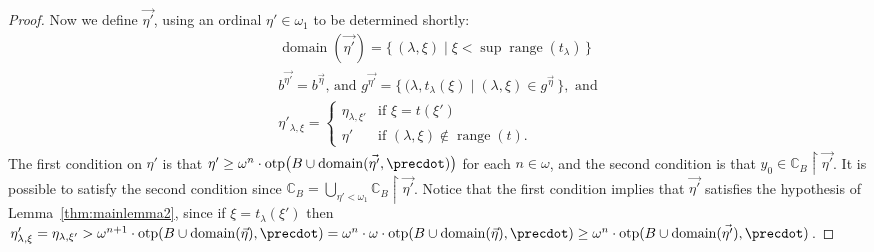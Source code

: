 \documentclass[
twoside,
]{article}
\theoremstyle{definition}
\theoremstyle{remark}
\newcommand{\etarestrict}{\restrict}
\newcommand{\xrep}{\etarestrict\vetap}
\newcommand{\vetap}{\vec{\eta'}}
\DeclareMathOperator{\otp}{otp}
\newcommand{\set}[1]{\{\,#1\,\}}
\newcommand{\restrict}{{\upharpoonright}}
\DeclareMathOperator{\range}{range}
\DeclareMathOperator{\domain}{domain}
\newcommand\chang{\mathbb{C}}
\begin{document}
\begin{proof}
  Now we define $\vetap$, using an ordinal $\eta'\in\omega_1$ to be
  determined shortly: 
  \begin{gather*}
    \domain(\vetap)=\set{(\lambda,\xi)\mid\xi<\sup\range(t_{\lambda})}\\
    b^{\vetap}=b^{\vec\eta}\text{, and }
    g^{\vetap}=\set{(\lambda,t_{\lambda}(\xi)\mid (\lambda,\xi)\in
      g^{\vec\eta}}, \text{ and}\\
    \eta'_{\lambda,\xi} =
    \begin{cases}
      \eta_{\lambda,\xi'}&\text{if $\xi=t(\xi')$ }\\
      \eta'&\text{if $(\lambda,\xi)\notin\range(t)$}.
    \end{cases}
  \end{gather*}
  The first condition on $\eta'$ is that $\eta'\geq
  \omega^{n}\cdot\otp\bigl(B\cup\domain(\vetap,\precdot)\bigr)$ for each
  $n\in\omega$, and the second condition is that $y_0\in \chang_{B}\xrep$.
  It is possible to satisfy the second condition  since
  $\chang_B=\bigcup_{\eta'<\omega_1}\chang_B\xrep$.  Notice that the
  first condition implies that $\vetap$ satisfies the hypothesis of
  Lemma~\ref{thm:mainlemma2}, since if  $\xi=t_{\lambda}(\xi')$ then 
  $\eta'_{\lambda,\xi}=\eta_{\lambda,\xi'}>
  \omega^{n+1}\cdot\otp(B\cup\domain(\vec\eta),\precdot)=\omega^{n}\cdot
  \omega\cdot\otp(B\cup\domain(\vec\eta),\precdot)
  \geq\omega^{n}\cdot\otp(B\cup\domain(\vetap),\precdot)$.

  \newcommand\taumap{\tau}
  

\end{proof}
\end{document}
